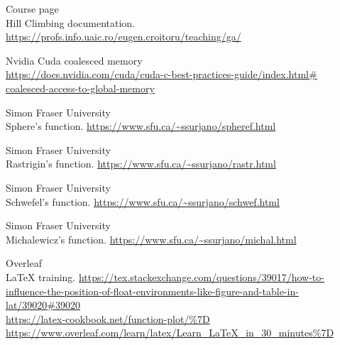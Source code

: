 \documentclass{article}
\begin{document}
\begin{thebibliography}{9}

  Course page \\ Hill Climbing documentation.
  \url{https://profs.info.uaic.ro/eugen.croitoru/teaching/ga/}

  Nvidia Cuda coalesced memory \\
  \url{https://docs.nvidia.com/cuda/cuda-c-best-practices-guide/index.html\# coalesced-access-to-global-memory}

  Simon Fraser University \\ Sphere's function.
  \url{https://www.sfu.ca/~ssurjano/spheref.html}

  Simon Fraser University \\  Rastrigin's function.
  \url{https://www.sfu.ca/~ssurjano/rastr.html}

  Simon Fraser University \\ Schwefel's function.
  \url{https://www.sfu.ca/~ssurjano/schwef.html}

  Simon Fraser University \\ Michalewicz's function.
  \url{https://www.sfu.ca/~ssurjano/michal.html}

  Overleaf \\ LaTeX training.
  \url{https://tex.stackexchange.com/questions/39017/how-to-influence-the-position-of-float-environments-like-figure-and-table-in-lat/39020#39020} \\
  \url{https://latex-cookbook.net/function-plot/%7D} \\  
  \url{https://www.overleaf.com/learn/latex/Learn_LaTeX_in_30_minutes%7D}


\end{thebibliography}  
\end{document}
